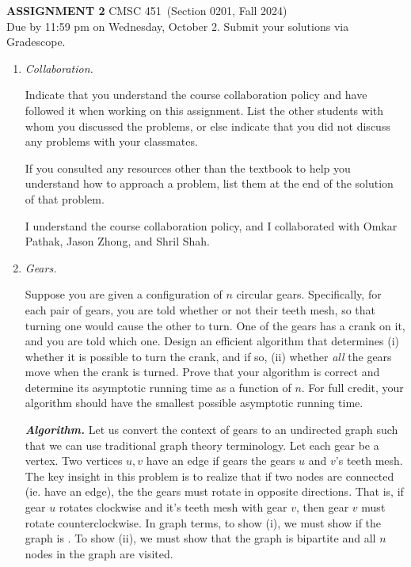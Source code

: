 \documentclass[11pt]{article}
\newcommand{\term}{Section 0201, Fall 2024}
\newcommand{\course}{CMSC 451}
\newcommand{\anum}{2}
\newcommand{\duedate}{Wednesday, October 2}
\newcounter{totalpoints}
\newcommand{\points}[1]{\addtocounter{totalpoints}{#1}{[#1 point\ifthenelse{\equal{#1}{1}}{}{s}]}}
\begin{document}
{\large\textbf{ASSIGNMENT \anum} \hfill \course\ (\term)}
\smallskip\\
Due by 11:59 pm on \duedate. Submit your solutions via Gradescope.

\begin{enumerate}[leftmargin=*,start=0]


\item \emph{Collaboration.}

Indicate that you understand the course collaboration policy and have followed it when working on this assignment. List the other students with whom you discussed the problems, or else indicate that you did not discuss any problems with your classmates.

If you consulted any resources other than the textbook to help you understand how to approach a problem, list them at the end of the solution of that problem.

\hfill

I understand the course collaboration policy, and I collaborated with Omkar Pathak, Jason Zhong, and Shril Shah.

\newpage


\item \emph{Gears.} \points{20}

Suppose you are given a configuration of $n$ circular gears. Specifically, for each pair of gears, you are told whether or not their teeth mesh, so that turning one would cause the other to turn. One of the gears has a crank on it, and you are told which one. Design an efficient algorithm that determines (i) whether it is possible to turn the crank, and if so, (ii) whether \emph{all} the gears move when the crank is turned. Prove that your algorithm is correct and determine its asymptotic running time as a function of $n$. For full credit, your algorithm should have the smallest possible asymptotic running time.

\textit{\textbf{Algorithm.}} Let us convert the context of gears to an undirected graph such that we can use traditional 
graph theory terminology. Let each gear be a vertex. Two vertices $u, v$ have an edge if gears 
the gears $u$ and $v$'s teeth mesh. The key insight in this problem is to realize that if two nodes are connected (ie. have an edge), 
the the gears must rotate in opposite directions. That is, if gear $u$ rotates clockwise and it's teeth mesh with gear $v$, then gear $v$ must rotate 
counterclockwise. In graph terms, to show (i), we must show if the graph is . 
To show (ii), we must show that the graph is bipartite and all $n$ nodes in the graph are visited. 


\end{enumerate}
\end{document}

